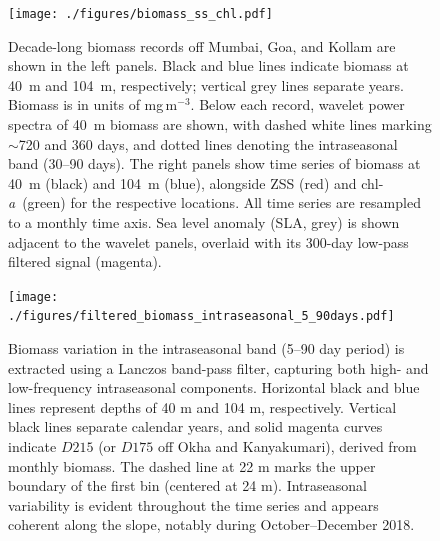 \documentclass[authoryear,review,11pt]{elsarticle}
\newcommand{\chla}{chl-{\emph{a}}}
\begin{document}
\begin{figure}[htbp]
	\centering
	\texttt{[image: ./figures/biomass\_ss\_chl.pdf]} 
	\captionsetup{justification=justified,font=footnotesize,skip=0.05\baselineskip,width=\textwidth}
	\caption{Decade-long biomass records off Mumbai, Goa, and Kollam are shown in the left panels. Black and blue lines indicate biomass at 40~m and 104~m, respectively; vertical grey lines separate years. Biomass is in units of mg\,m$^{-3}$. Below each record, wavelet power spectra of 40~m biomass are shown, with dashed white lines marking $\sim$720 and 360 days, and dotted lines denoting the intraseasonal band (30--90 days). The right panels show time series of biomass at 40~m (black) and 104~m (blue), alongside ZSS (red) and \chla\ (green) for the respective locations. All time series are resampled to a monthly time axis. Sea level anomaly (SLA, grey) is shown adjacent to the wavelet panels, overlaid with its 300-day low-pass filtered signal (magenta).}
	\label{fig:biomass_ss_chl}
\end{figure}


\begin{figure}[htbp]
	\centering
	\texttt{[image: ./figures/filtered\_biomass\_intraseasonal\_5\_90days.pdf]} 
	\caption{Biomass variation in the intraseasonal band (5--90 day period) is extracted using a Lanczos band-pass filter, capturing both high- and low-frequency intraseasonal components. Horizontal black and blue lines represent depths of 40 m and 104 m, respectively. Vertical black lines separate calendar years, and solid magenta curves indicate $D215$ (or $D175$ off Okha and Kanyakumari), derived from monthly biomass. The dashed line at 22 m marks the upper boundary of the first bin (centered at 24 m). Intraseasonal variability is evident throughout the time series and appears coherent along the slope, notably during October--December 2018.}
	\label{fig:filtered_biomass_intraseasonal_5_90days}
\end{figure}
\end{document}
